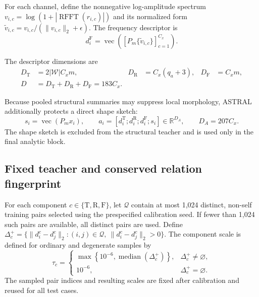 \documentclass[pdflatex,sn-mathphys-num]{sn-jnl}
\newcommand{\1}{\mathbf{1}}
\theoremstyle{plain}
\begin{document}
	For each channel, define the nonnegative log-amplitude spectrum $v_{i,c}=\log(1+|\operatorname{RFFT}(r_{i,c})|)$ and its normalized form $\widetilde v_{i,c}=v_{i,c}/(\|v_{i,c}\|_2+\epsilon)$. The frequency descriptor is
	\begin{equation}
		d_i^{\mathrm{F}}
		=
		\operatorname{vec}\!\left(
		\left[
		P_m\{\widetilde v_{i,c}\}
		\right]_{c=1}^{C_x}
		\right).
		\label{eq:freqdesc}
	\end{equation}
	
	The descriptor dimensions are
	\begin{equation}
		\begin{aligned}
			D_{\mathrm{T}}&=2|\mathcal{W}|C_xm,&
			D_{\mathrm{R}}&=C_x(q_a+3),&
			D_{\mathrm{F}}&=C_xm,\\
			D&=D_{\mathrm{T}}+D_{\mathrm{R}}+D_{\mathrm{F}}=183C_x.
		\end{aligned}
		\label{eq:dims}
	\end{equation}
	
	Because pooled structural summaries may suppress local morphology,
	ASTRAL additionally protects a direct shape sketch:
	\begin{equation}
		s_i
		=
		\operatorname{vec}(P_mx_i),
		\qquad
		a_i
		=
		\left[
		d_i^{\mathrm{T}};
		d_i^{\mathrm{R}};
		d_i^{\mathrm{F}};
		s_i
		\right]
		\in\mathbb{R}^{D_A},
		\qquad
		D_A=207C_x.
		\label{eq:analytic}
	\end{equation}
	The shape sketch is excluded from the structural teacher and is used
	only in the final analytic block.
	
	\subsection{Fixed teacher and conserved relation fingerprint}
	
	For each component $c\in\{\mathrm{T},\mathrm{R},\mathrm{F}\}$, let $\mathcal{Q}$ contain at most 1,024 distinct, non-self training
	pairs selected using the prespecified calibration seed. If fewer than
	1,024 such pairs are available, all distinct pairs are used. Define $\Delta_c^+=\{\|d_i^c-d_j^c\|_2:(i,j)\in\mathcal{Q},\ \|d_i^c-d_j^c\|_2>0\}$. The component scale is defined for ordinary and degenerate samples by
	\begin{equation}
		\tau_c=
		\begin{cases}
			\max\!\left\{10^{-6},\operatorname{median}(\Delta_c^+)\right\},
			& \Delta_c^+\neq\varnothing,\\
			10^{-6}, & \Delta_c^+=\varnothing.
		\end{cases}
		\label{eq:kernelscale}
	\end{equation}
	The sampled pair indices and resulting scales are fixed after
	calibration and reused for all test cases.
	
\end{document}
